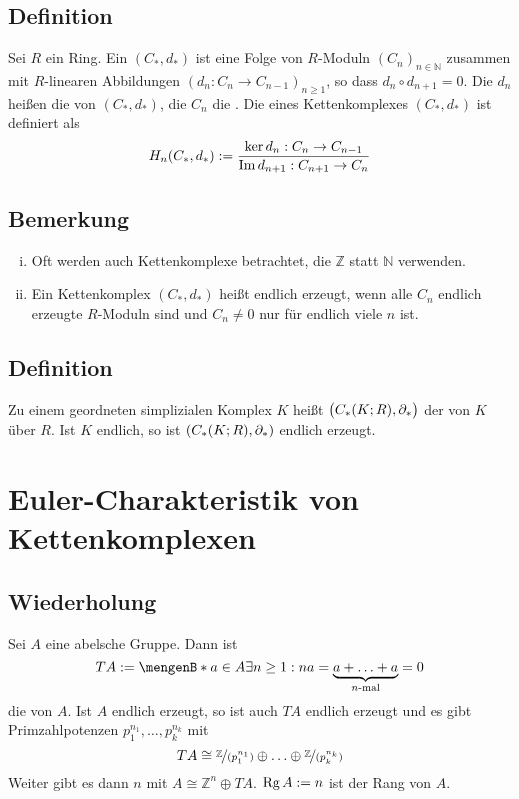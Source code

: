 \subsection[Definition: $R$-Kettenkomplex, $n$-te Homologie]{Definition} %
\label{sub:312}
Sei $R$ ein Ring. Ein  $(C_*, d_*)$ ist eine Folge von $R$-Moduln $(C_n)_{n \in \mathds{N}}$ zusammen mit $R$-linearen Abbildungen 
$(d_n : C_n \to C_{n-1})_{n \ge 1}$, so dass $d_n \circ d_{n+1} = 0$. Die $d_n$ heißen die  von $(C_*,d_*)$, die $C_n$ die .
Die  eines Kettenkomplexes $(C_*,d_*)$ ist definiert als
\[
	H_n(C_*, d_*) := \frac{\ker d_n : C_n \to C_{n-1}}{\im d_{n+1} : C_{n+1} \to C_n} 
\]

\subsection[Bemerkungen zu Kettenkomplexen]{Bemerkung} %
\label{sub:313}
\begin{enumerate}[(i)]
	\item Oft werden auch Kettenkomplexe betrachtet, die $\mathds{Z}$ statt $\mathds{N}$ verwenden.
	\item Ein Kettenkomplex $(C_*,d_*)$ heißt endlich erzeugt, wenn alle $C_n$ endlich erzeugte $R$-Moduln sind und $C_n \not= 0$ nur für endlich viele $n$ ist.
\end{enumerate}

\subsection[Definition: Simplizialer Kettenkomplex]{Definition} %
\label{sub:314}
Zu einem geordneten simplizialen Komplex $K$ heißt $\enbrace[\big]{C_*(K;R), \partial_*}$ der  von $K$ über $R$. 
Ist $K$ endlich, so ist $\enbrace*{C_*(K;R), \partial_*}$ endlich erzeugt.
\newpage

\section{Euler-Charakteristik von Kettenkomplexen} %
\label{sec:4}

\subsection[Wiederholung: Torsionsgruppe]{Wiederholung} %
\label{sub:41}
Sei $A$ eine abelsche Gruppe. Dann ist 
\[
	T A := \set[a \in A]{\exists n \ge 1 : n a = \underbrace{a + \ldots + a}_{\text{$n$-mal}} = 0} 
\]
die  von $A$. Ist $A$ endlich erzeugt, so ist auch $TA$ endlich erzeugt und es gibt Primzahlpotenzen $p_1^{n_1}, \ldots , p_k^{n_k}$ mit
\[
	TA \cong \nicefrac{\mathds{Z}}{(p_1^{n_1})} \oplus \ldots \oplus \nicefrac{\mathds{Z}}{(p_k^{n_k})}
\]
Weiter gibt es dann $n$ mit $A \cong \mathds{Z}^n \oplus TA$. $\Rg A := n$ ist der Rang von $A$.

